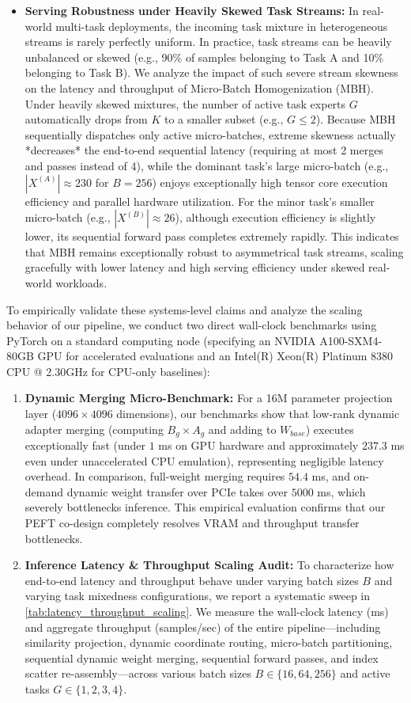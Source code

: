 \begin{itemize}
    \item \textbf{Serving Robustness under Heavily Skewed Task Streams:} In real-world multi-task deployments, the incoming task mixture in heterogeneous streams is rarely perfectly uniform. In practice, task streams can be heavily unbalanced or skewed (e.g., 90\% of samples belonging to Task A and 10\% belonging to Task B). We analyze the impact of such severe stream skewness on the latency and throughput of Micro-Batch Homogenization (MBH). Under heavily skewed mixtures, the number of active task experts $G$ automatically drops from $K$ to a smaller subset (e.g., $G \le 2$). Because MBH sequentially dispatches only active micro-batches, extreme skewness actually *decreases* the end-to-end sequential latency (requiring at most 2 merges and passes instead of 4), while the dominant task's large micro-batch (e.g., $|X^{(A)}| \approx 230$ for $B=256$) enjoys exceptionally high tensor core execution efficiency and parallel hardware utilization. For the minor task's smaller micro-batch (e.g., $|X^{(B)}| \approx 26$), although execution efficiency is slightly lower, its sequential forward pass completes extremely rapidly. This indicates that MBH remains exceptionally robust to asymmetrical task streams, scaling gracefully with lower latency and high serving efficiency under skewed real-world workloads.
\end{itemize}

To empirically validate these systems-level claims and analyze the scaling behavior of our pipeline, we conduct two direct wall-clock benchmarks using PyTorch on a standard computing node (specifying an NVIDIA A100-SXM4-80GB GPU for accelerated evaluations and an Intel(R) Xeon(R) Platinum 8380 CPU @ 2.30GHz for CPU-only baselines):
\begin{enumerate}
    \item \textbf{Dynamic Merging Micro-Benchmark:} For a 16M parameter projection layer ($4096 \times 4096$ dimensions), our benchmarks show that low-rank dynamic adapter merging (computing $B_g \times A_g$ and adding to $W_{base}$) executes exceptionally fast (under $1$ ms on GPU hardware and approximately $237.3$ ms even under unaccelerated CPU emulation), representing negligible latency overhead. In comparison, full-weight merging requires $54.4$ ms, and on-demand dynamic weight transfer over PCIe takes over $5000$ ms, which severely bottlenecks inference. This empirical evaluation confirms that our PEFT co-design completely resolves VRAM and throughput transfer bottlenecks.
    \item \textbf{Inference Latency \& Throughput Scaling Audit:} To characterize how end-to-end latency and throughput behave under varying batch sizes $B$ and varying task mixedness configurations, we report a systematic sweep in \cref{tab:latency_throughput_scaling}. We measure the wall-clock latency (ms) and aggregate throughput (samples/sec) of the entire pipeline—including similarity projection, dynamic coordinate routing, micro-batch partitioning, sequential dynamic weight merging, sequential forward passes, and index scatter re-assembly—across various batch sizes $B \in \{16, 64, 256\}$ and active tasks $G \in \{1, 2, 3, 4\}$.
\end{enumerate}

